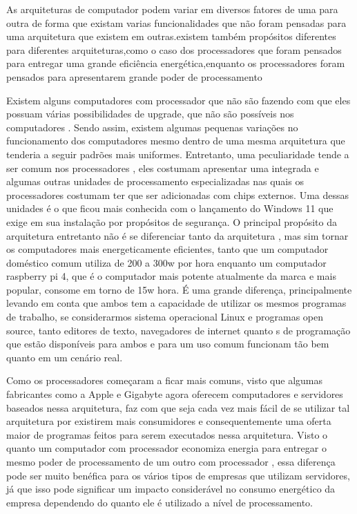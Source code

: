 \documentclass[
	12pt,				%
	openright,			%
	oneside,			%
	a4paper,			%
	english,			%
	french,				%
	spanish,			%
	brazil,				%
	]{abntex2}
\begin{document}
As arquiteturas de computador podem variar em diversos fatores de uma para outra de forma que existam varias funcionalidades que não foram pensadas para uma arquitetura que existem em outras.existem também propósitos diferentes para diferentes arquiteturas,como o caso dos processadores  que foram pensados para entregar uma grande eficiência energética,enquanto os processadores  foram pensados para apresentarem grande poder de processamento\newline

Existem alguns computadores com processador  que não são  fazendo com que eles possuam várias possibilidades de upgrade, que não são possíveis nos computadores . Sendo assim, existem algumas pequenas variações no funcionamento dos computadores mesmo dentro de uma mesma arquitetura que tenderia a seguir padrões mais uniformes. Entretanto, uma peculiaridade tende a ser comum nos processadores , eles costumam apresentar uma  integrada e algumas outras unidades de processamento especializadas nas quais os processadores  costumam ter que ser adicionadas com chips externos. Uma dessas unidades é o  que ficou mais conhecida com o lançamento do Windows 11 que exige em sua instalação por propósitos de segurança. O principal propósito da arquitetura  entretanto não é se diferenciar tanto da arquitetura , mas sim tornar os computadores mais energeticamente eficientes, tanto que um computador doméstico comum utiliza de 200 a 300w por hora enquanto um computador raspberry pi 4, que é o computador  mais potente atualmente da marca e mais popular, consome em torno de 15w hora. É uma grande diferença, principalmente levando em conta que ambos tem a capacidade de utilizar os mesmos programas de trabalho, se considerarmos sistema operacional Linux e programas open source, tanto editores de texto, navegadores de internet quanto s de programação que estão disponíveis para ambos e para um uso comum funcionam tão bem quanto em um cenário real.\newline

Como os processadores  começaram a ficar mais comuns, visto que algumas fabricantes como a Apple e Gigabyte agora oferecem computadores e servidores baseados nessa arquitetura, faz com que seja cada vez mais fácil de se utilizar tal arquitetura por existirem mais consumidores e consequentemente uma oferta maior de programas feitos para serem executados nessa arquitetura. Visto o quanto um computador com processador  economiza energia para entregar o mesmo poder de processamento de um outro com processador , essa diferença pode ser muito benéfica para os vários tipos de empresas que utilizam servidores, já que isso pode significar um impacto considerável no consumo energético da empresa dependendo do quanto ele é utilizado a nível de processamento.\newline
\end{document}
